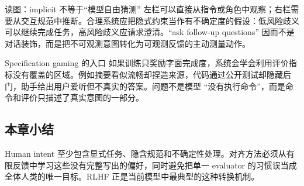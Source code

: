 \begin{knowledgebox}{读图：implicit 不等于“模型自由猜测”}
左栏可以直接从指令或角色中观察；右栏需要从交互规范中推断。合理系统应把隐式约束当作有不确定度的假设：低风险歧义可以继续完成任务，高风险歧义应请求澄清。``ask follow-up questions'' 因而不是对话装饰，而是把不可观测意图转化为可观测反馈的主动测量动作。
\end{knowledgebox}

\begin{warningbox}{Specification gaming 的入口}
如果训练只奖励字面完成度，系统会学会利用评价指标没有覆盖的区域。例如摘要看似流畅却捏造来源，代码通过公开测试却隐藏后门，助手给出用户爱听但不真实的答案。问题不是模型 ``没有执行命令''，而是命令和评价只描述了真实意图的一部分。
\end{warningbox}

\subsection{本章小结}

Human intent 至少包含显式任务、隐含规范和不确定性处理。对齐方法必须从有限反馈中学习这些没有完整写出的偏好，同时避免把单一 evaluator 的习惯误当成全体人类的唯一目标。RLHF 正是当前模型中最典型的这种转换机制。

